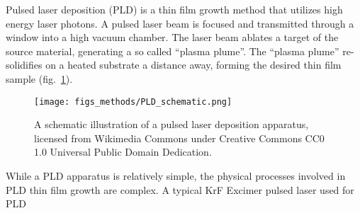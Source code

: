 Pulsed laser deposition (PLD) is a thin film growth method that utilizes high energy laser photons. A pulsed laser beam is focused and transmitted through a window into a high vacuum chamber. The laser beam ablates a target of the source material, generating a so called ``plasma plume''. The ``plasma plume'' re-solidifies on a heated substrate a distance away, forming the desired thin film sample (fig.~\ref{fig:PLD_schematic}).%
\begin{figure}[ht]%
	\centering%
    \texttt{[image: figs\_methods/PLD\_schematic.png]}%
    \caption[Schematic Illustration of a PLD apparatus]{\label{fig:PLD_schematic}A schematic illustration of a pulsed laser deposition apparatus, licensed from Wikimedia Commons under Creative Commons CC0 1.0 Universal Public Domain Dedication.}%
\end{figure}%

While a PLD apparatus is relatively simple, the physical processes involved in PLD thin film growth are complex. A typical KrF Excimer pulsed laser used for PLD 